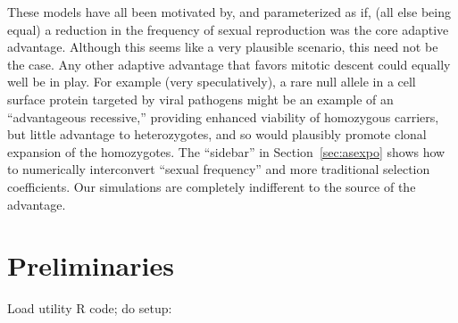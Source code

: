 \documentclass{article}\usepackage[]{graphicx}\usepackage[]{color}
\begin{document}
These models have all been motivated by, and parameterized as if, (all else being equal) a reduction
in the frequency of sexual reproduction was the core adaptive advantage.  Although this seems like a
very plausible scenario, this need not be the case.  Any other adaptive advantage that favors
mitotic descent could equally well be in play.  For example (very speculatively), a rare null allele
in a cell surface protein targeted by viral pathogens might be an example of an ``advantageous
recessive,'' providing enhanced viability of homozygous carriers, but little advantage to
heterozygotes, and so would plausibly promote clonal expansion of the homozygotes.  The ``sidebar'' in
Section~\ref{sec:asexpo} shows how to numerically interconvert ``sexual frequency'' and more
traditional selection coefficients.  Our simulations are completely indifferent to the source of the
advantage. 

%
\section{Preliminaries}
\label{sec:prelim}
%
Load utility R code; do setup:
\end{document}
